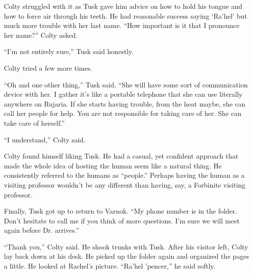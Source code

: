 Colty struggled with it as Tusk gave him advice on how to hold his tongue and how to force air
through his teeth. He had reasonable success saying `Ra'hel' but much more trouble with her last
name. ``How important is it that I pronounce her name?'' Colty asked.

``I'm not entirely sure,'' Tusk said honestly.

Colty tried a few more times.

``Oh and one other thing,'' Tusk said. ``She will have some sort of communication device with
her. I gather it's like a portable telephone that she can use literally anywhere on Rujaria. If
she starts having trouble, from the heat maybe, she can call her people for help. You are not
responsible for taking care of her. She can take care of herself.''

``I understand,'' Colty said.

Colty found himself liking Tusk. He had a casual, yet confident approach that made the whole
idea of hosting the human seem like a natural thing. He consistently referred to the humans as
``people.'' Perhaps having the human as a visiting professor wouldn't be any different than
having, say, a Forbinite visiting professor.

Finally, Tusk got up to return to Varnok. ``My phone number is in the folder. Don't hesitate to
call me if you think of more questions. I'm sure we will meet again before Dr. 
arrives.''

``Thank you,'' Colty said. He shook trunks with Tusk. After his visitor left, Colty lay back
down at his desk. He picked up the folder again and organized the pages a little. He looked at
Rachel's picture. ``Ra'hel 'pencer,'' he said softly.

